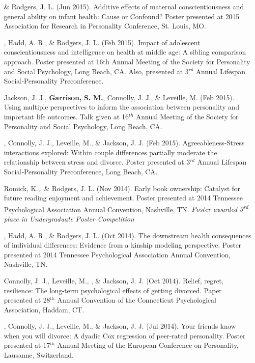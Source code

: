 %
\item \meb \& Rodgers, J. L. (Jun 2015). Additive effects of maternal conscientiousness and general ability on infant health: Cause or Confound? Poster presented at 2015 Association for Research in Personality Conference, St. Louis, MO.%
\item \meb, Hadd, A. R., \& Rodgers, J. L. (Feb 2015). Impact of adolescent conscientiousness and intelligence on health at middle age: A sibling comparison approach. Poster presented at 16th Annual Meeting of the Society for Personality and  Social Psychology, Long Beach, CA. Also, presented at 3$^{rd}$ Annual Lifespan Social-Personality Preconference.
\item Jackson, J. J., \textbf{Garrison, S. M.}, Connolly, J. J., \& Leveille, M. (Feb 2015). Using multiple perspectives to inform the association between personality and important life outcomes. Talk given at 16$^{th}$ Annual Meeting of the Society for Personality and  Social Psychology, Long Beach, CA.
\item\meb, Connolly, J. J., Leveille, M., \& Jackson, J. J. (Feb 2015). Agreeableness-Stress interactions explored: Within couple differences partially moderate the relationship between stress and divorce. Poster presented at 3$^{rd}$ Annual Lifespan Social-Personality Preconference, Long Beach, CA.
\item Romick, K.,\student \meb, \& Rodgers, J. L. (Nov 2014). Early book ownership: Catalyst for future reading enjoyment and achievement. Poster presented at 2014 Tennessee Psychological Association Annual Convention, Nashville, TN. \textit{Poster awarded 3\textsuperscript{rd} place in Undergraduate Poster Competition}
\item\meb, Hadd, A. R., \& Rodgers, J. L. (Oct 2014). The downstream health consequences of individual differences: Evidence from a kinship modeling perspective. Poster presented at 2014 Tennessee Psychological Association Annual Convention, Nashville, TN.
\item Connolly, J. J., Leveille, M., \meb, \& Jackson, J. J. (Oct 2014). Relief,  regret,  resilience: The  long-term  psychological  effects  of  getting divorced. Paper presented at 28$^{th}$ Annual Convention of the Connecticut Psychological Association, Haddam, CT.
\item\meb, Connolly, J. J., Leveille, M., \& Jackson, J. J. (Jul 2014). Your friends know when you will divorce: A dyadic Cox regression of peer-rated personality. Poster presented at 17$^{th}$ Annual Meeting of the European Conference on Personality, Lausanne, Switzerland.
